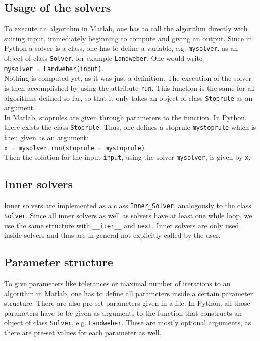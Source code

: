 \documentclass[12pt]{scrartcl}
\begin{document}
\subsection{Usage of the solvers}
To execute an algorithm in Matlab, one has to call the algorithm directly with suiting input, immediately beginning to compute and giving an output. Since in Python a solver is a class, one has to define a variable, e.g. \texttt{mysolver}, as an object of class \texttt{Solver}, for example \texttt{Landweber}. One would write\\
\texttt{mysolver = Landweber(input)}.\\
Nothing is computed yet, as it was just a definition. The execution of the solver is then accomplished by using the attribute \texttt{run}. This function is the same for all algorithms defined so far, so that it only takes an object of class \texttt{Stoprule} as an argument.\\
In Matlab, stoprules are given through parameters to the function. In Python, there exists the class \texttt{Stoprule}. Thus, one defines a stoprule \texttt{mystoprule} which is then given as an argument:\\
\texttt{x = mysolver.run(stoprule = mystoprule)}.\\
Then the solution for the input \texttt{input}, using the solver \texttt{mysolver}, is given by \texttt{x}.
\subsection{Inner solvers}
Inner solvers are implemented as a class \texttt{Inner\_Solver}, analogously to the class \texttt{Solver}. Since all inner solvers as well as solvers have  at least one while loop, we use the same structure with \texttt{\_\_iter\_\_} and \texttt{next}. Inner solvers are only used inside solvers and thus are in general not explicitly called by the user.
\subsection{Parameter structure}
To give parameters like tolerances or maximal number of iterations to an algorithm in Matlab, one has to define all parameters inside a certain parameter structure. There are also pre-set parameters given in a file. In Python, all those parameters have to be given as arguments to the function that constructs an object of class \texttt{Solver}, e.g. \texttt{Landweber}. These are mostly optional arguments, as there are pre-set values for each parameter as well.
\end{document}
